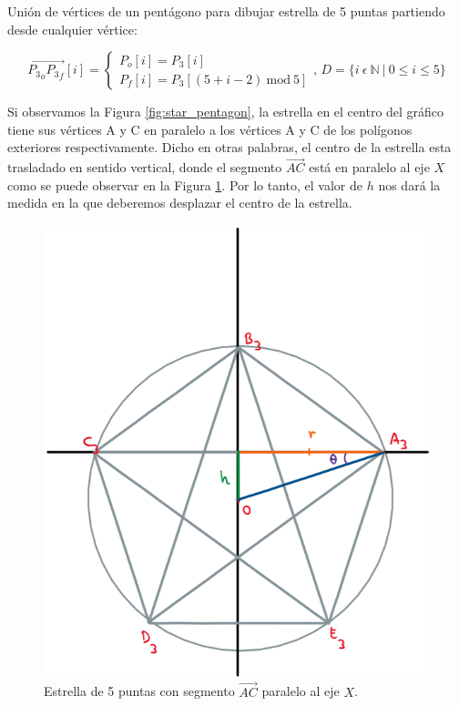 \documentclass[oneside, a4paper]{article}
\begin{document}
            Unión de vértices de un pentágono para dibujar estrella de 5 puntas partiendo desde cualquier vértice:
            
            \begin{equation}
                \overrightarrow{{P_{3}}_{o}{P_{3}}_{f}}[i] =
                \begin{cases}
                    P_{o}[i] = P_{3}[i] \\
                    P_{f}[i] = P_{3}[(5 + i - 2) \: \textrm{mod} \: 5]
                \end{cases}
                \textrm{, } D = \{ i \: \epsilon \: \mathbb{N} \: | \: 0 \leqslant i \leqslant 5 \}
                \label{eq:five_pointed_star_vertices}
            \end{equation}

            Si observamos la Figura \ref{fig:star_pentagon}, la estrella en el centro del gráfico tiene sus vértices A y C en paralelo a los vértices A y C de los polígonos exteriores respectivamente. Dicho en otras palabras, el centro de la estrella esta trasladado en sentido vertical, donde el segmento $\overrightarrow{AC}$ está en paralelo al eje $X$ como se puede observar en la Figura \ref{fig:five_pointed_star_translated}. Por lo tanto, el valor de $h$ nos dará la medida en la que deberemos desplazar el centro de la estrella.

            \begin{figure}[H]
                \centering
                \includegraphics[scale=0.5]{five_pointed_star_translated.png}
                \caption{Estrella de 5 puntas con segmento $\overrightarrow{AC}$ paralelo al eje $X$.}
                \label{fig:five_pointed_star_translated}
            \end{figure}
\end{document}
